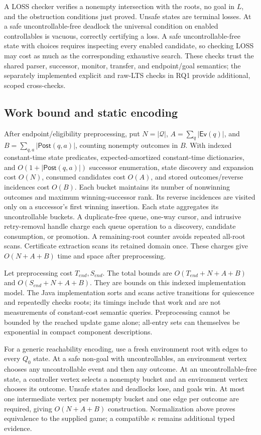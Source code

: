\documentclass[11pt]{article}
\newcommand{\Post}{\mathsf{Post}}
\newcommand{\Ev}{\mathsf{Ev}}
\begin{document}
A LOSS checker verifies a nonempty intersection with the roots, no goal in $L$, and the obstruction conditions just proved. Unsafe states are terminal losses. At a safe uncontrollable-free deadlock the universal condition on enabled controllables is vacuous, correctly certifying a loss. A safe uncontrollable-free state with choices requires inspecting every enabled candidate, so checking LOSS may cost as much as the corresponding exhaustive search. These checks trust the shared parser, successor, monitor, transfer, and endpoint/goal semantics; the separately implemented explicit and raw-LTS checks in RQ1 provide additional, scoped cross-checks.

\subsection{Work bound and static encoding}
After endpoint/eligibility preprocessing, put $N=|\mathcal Q|$, $A=\sum_q|\Ev(q)|$, and $B=\sum_{q,a}|\Post(q,a)|$, counting nonempty outcomes in $B$. With indexed constant-time state predicates, expected-amortized constant-time dictionaries, and $O(1+|\Post(q,a)|)$ successor enumeration, state discovery and expansion cost $O(N)$, consumed candidates cost $O(A)$, and stored outcomes/reverse incidences cost $O(B)$. Each bucket maintains its number of nonwinning outcomes and maximum winning-successor rank. Its reverse incidences are visited only on a successor's first winning insertion. Each state aggregates its uncontrollable buckets. A duplicate-free queue, one-way cursor, and intrusive retry-removal handle charge each queue operation to a discovery, candidate consumption, or promotion. A remaining-root counter avoids repeated all-root scans. Certificate extraction scans its retained domain once. These charges give $O(N+A+B)$ time and space after preprocessing.

Let preprocessing cost $T_{end},S_{end}$. The total bounds are $O(T_{end}+N+A+B)$ and $O(S_{end}+N+A+B)$. They are bounds on this indexed implementation model. The Java implementation sorts and scans active transitions for quiescence and repeatedly checks roots; its timings include that work and are not measurements of constant-cost semantic queries. Preprocessing cannot be bounded by the reached update game alone; all-entry sets can themselves be exponential in compact component descriptions.

For a generic reachability encoding, use a fresh environment root with edges to every $Q_0$ state. At a safe non-goal with uncontrollables, an environment vertex chooses any uncontrollable event and then any outcome. At an uncontrollable-free state, a controller vertex selects a nonempty bucket and an environment vertex chooses its outcome. Unsafe states and deadlocks lose, and goals win. At most one intermediate vertex per nonempty bucket and one edge per outcome are required, giving $O(N+A+B)$ construction. Normalization above proves equivalence to the supplied game; a compatible $\kappa$ remains additional typed evidence.
\end{document}
